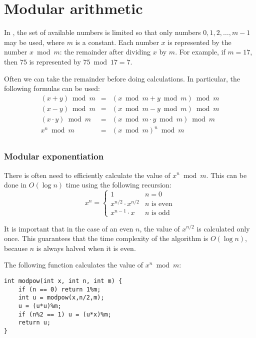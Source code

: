 \section{Modular arithmetic}


In ,
the set of available numbers is limited so
that only numbers $0,1,2,\ldots,m-1$ may be used,
where $m$ is a constant.
Each number $x$ is
represented by the number $x \bmod m$:
the remainder after dividing $x$ by $m$.
For example, if $m=17$, then $75$
is represented by $75 \bmod 17 = 7$.

Often we can take the remainder before doing
calculations.
In particular, the following formulas can be used:
\[
\begin{array}{rcl}
(x+y) \bmod m & = & (x \bmod m + y \bmod m) \bmod m \\
(x-y) \bmod m & = & (x \bmod m - y \bmod m) \bmod m \\
(x \cdot y) \bmod m & = & (x \bmod m \cdot y \bmod m) \bmod m \\
x^n \bmod m & = & (x \bmod m)^n \bmod m \\
\end{array}
\]

\subsubsection{Modular exponentiation}

There is often need to efficiently calculate
the value of $x^n \bmod m$.
This can be done in $O(\log n)$ time
using the following recursion:
\begin{equation*}
    x^n = \begin{cases}
               1        & n = 0\\
               x^{n/2} \cdot x^{n/2} & \text{$n$ is even}\\
               x^{n-1} \cdot x & \text{$n$ is odd}
           \end{cases}
\end{equation*}

It is important that in the case of an even $n$,
the value of $x^{n/2}$ is calculated only once.
This guarantees that the time complexity of the
algorithm is $O(\log n)$, because $n$ is always halved
when it is even.

The following function calculates the value of
$x^n \bmod m$:

\begin{lstlisting}
int modpow(int x, int n, int m) {
    if (n == 0) return 1%m;
    int u = modpow(x,n/2,m);
    u = (u*u)%m;
    if (n%2 == 1) u = (u*x)%m;
    return u;
}
\end{lstlisting}


